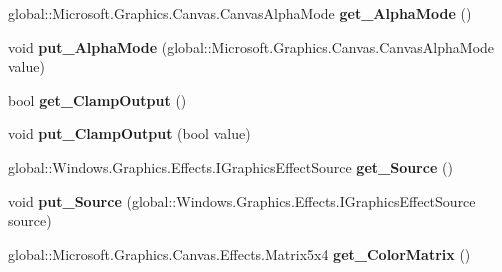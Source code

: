 \begin{DoxyCompactItemize}
global\+::\+Microsoft.\+Graphics.\+Canvas.\+Canvas\+Alpha\+Mode {\bfseries get\+\_\+\+Alpha\+Mode} ()
\item 
\mbox{\label{interface_microsoft_1_1_graphics_1_1_canvas_1_1_effects_1_1_i_color_matrix_effect_a19111c668130b4e202fdcf1b6370de85}} 
void {\bfseries put\+\_\+\+Alpha\+Mode} (global\+::\+Microsoft.\+Graphics.\+Canvas.\+Canvas\+Alpha\+Mode value)
\item 
\mbox{\label{interface_microsoft_1_1_graphics_1_1_canvas_1_1_effects_1_1_i_color_matrix_effect_a62eb1bdc351375bda377af3d39f4407d}} 
bool {\bfseries get\+\_\+\+Clamp\+Output} ()
\item 
\mbox{\label{interface_microsoft_1_1_graphics_1_1_canvas_1_1_effects_1_1_i_color_matrix_effect_ac0b84a9c8932bab90011df716de57abc}} 
void {\bfseries put\+\_\+\+Clamp\+Output} (bool value)
\item 
\mbox{\label{interface_microsoft_1_1_graphics_1_1_canvas_1_1_effects_1_1_i_color_matrix_effect_a92c8a46f383c29807747e76c7a9dab74}} 
global\+::\+Windows.\+Graphics.\+Effects.\+I\+Graphics\+Effect\+Source {\bfseries get\+\_\+\+Source} ()
\item 
\mbox{\label{interface_microsoft_1_1_graphics_1_1_canvas_1_1_effects_1_1_i_color_matrix_effect_ad452b45320bc870760daae883acd5030}} 
void {\bfseries put\+\_\+\+Source} (global\+::\+Windows.\+Graphics.\+Effects.\+I\+Graphics\+Effect\+Source source)
\item 
\mbox{\label{interface_microsoft_1_1_graphics_1_1_canvas_1_1_effects_1_1_i_color_matrix_effect_a6d1376fefa6b4c96bab74f3eaa0098a5}} 
global\+::\+Microsoft.\+Graphics.\+Canvas.\+Effects.\+Matrix5x4 {\bfseries get\+\_\+\+Color\+Matrix} ()
\item 
\mbox{\label{interface_microsoft_1_1_graphics_1_1_canvas_1_1_effects_1_1_i_color_matrix_effect_a891c719e926fd98a742b1e49dfd5e99e}} 

\end{DoxyCompactItemize}
